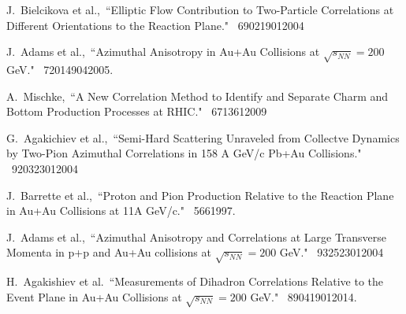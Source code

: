 \begin{thebibliography}{1000}

J.~Bielcikova et al.,~``Elliptic Flow Contribution to Two-Particle Correlations at Different Orientations to the Reaction Plane." \Journal{\PRC} {~69}{021901}{2004}

J.~Adams et al.,~``Azimuthal Anisotropy in Au+Au Collisions at $\sqrt{s_{NN}} = 200$ GeV." \Journal{\PRC} {~72}{014904}{2005}.

A.~Mischke,~``A New Correlation Method to Identify and Separate Charm and Bottom Production Processes at RHIC." \Journal{\PLB} {~671}{361}{2009}

G.~Agakichiev et al.,~``Semi-Hard Scattering Unraveled from Collectve Dynamics by Two-Pion Azimuthal Correlations in 158 A GeV/c Pb+Au Collisions." \Journal{\PRL} {~92}{032301}{2004}

J.~Barrette et al.,~``Proton and Pion Production Relative to the Reaction Plane in Au+Au Collisions at 11A GeV/c." \Journal{\PRC} {~56}{6}{1997}.

J.~Adams et al.,~``Azimuthal Anisotropy and Correlations at Large Transverse Momenta in p+p and Au+Au collisions at $\sqrt{s_{NN}} = 200$ GeV." \Journal{\PRL} {~93}{252301}{2004}

H.~Agakishiev et al.~``Measurements of Dihadron Correlations Relative to the Event Plane in Au+Au Collisions at $\sqrt{s_{NN}} = 200$ GeV." \Journal{\PRC} {~89}{041901}{2014}.


\end{thebibliography}
